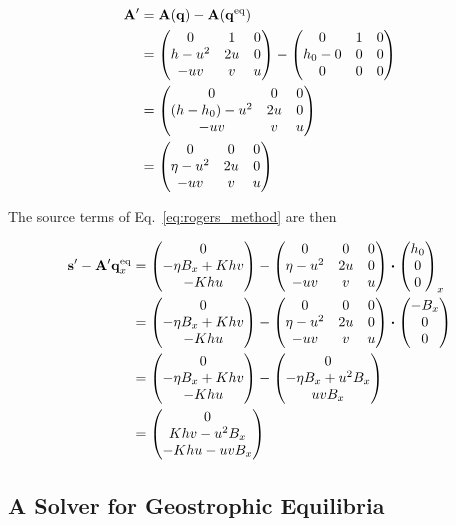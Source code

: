 \begin{align}
  \vb A' &= \vb A(\vb q) - \vb A(\eq{\vb q}) \\
  &= \mqty(
    0 & 1 & 0 \\
    h - u^2 & 2u & 0 \\
    -uv & v & u
  ) - \mqty(
    0 & 1 & 0 \\
    h_0 - 0 & 0 & 0 \\
    0 & 0 & 0
  ) \\
  &= \mqty(
    0 & 0 & 0 \\
    (h - h_0) - u^2 & 2u & 0 \\
    -uv & v & u
  ) \\
  &= \mqty(
    0 & 0 & 0 \\
    \eta - u^2 & 2u & 0 \\
    -uv & v & u
  )
\end{align}

The source terms of Eq.~\ref{eq:rogers_method} are then

\begin{align}
  \vb s' - \vb A' \eq{\vb q}_x
  &= \mqty(0 \\ -\eta B_x + K h v \\ - K h u) - \mqty(
    0 & 0 & 0 \\
    \eta - u^2 & 2u & 0 \\
    -uv & v & u
  ) \vdot \mqty(h_0 \\ 0 \\ 0)_x \\
  &= \mqty(0 \\ -\eta B_x + K h v \\ - K h u) - \mqty(
    0 & 0 & 0 \\
    \eta - u^2 & 2u & 0 \\
    -uv & v & u
  ) \vdot \mqty(- B_x \\ 0 \\ 0) \\
  &= \mqty(0 \\ -\eta B_x + K h v \\ - K h u) - \mqty(0 \\ - \eta B_x + u^2 B_x \\ uv B_x) \\
  &= \mqty(0 \\ K h v - u^2 B_x \\ - K h u - u v B_x )
\end{align}

\subsection{A Solver for Geostrophic Equilibria}
\label{sec:rogers_geo}

